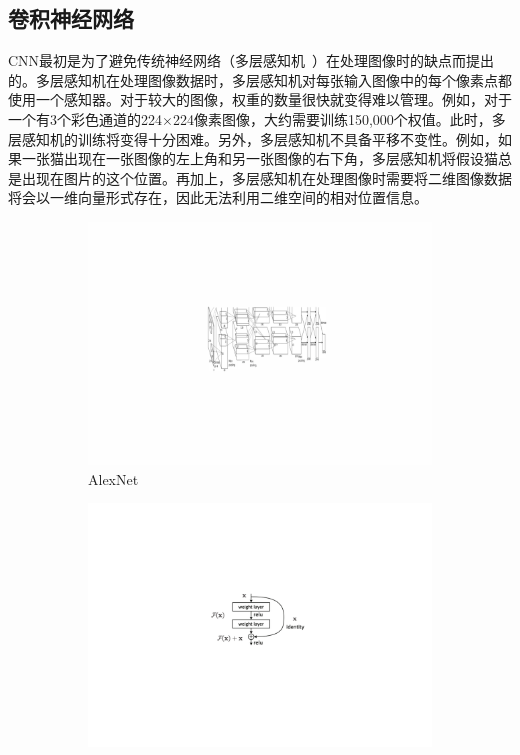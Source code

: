\subsection{卷积神经网络}\label{subsec:cnn_introduction}
CNN最初是为了避免传统神经网络（多层感知机~\cite{gardner1998artificial}）在处理图像时的缺点而提出的。多层感知机在处理图像数据时，多层感知机对每张输入图像中的每个像素点都使用一个感知器。对于较大的图像，权重的数量很快就变得难以管理。例如，对于一个有3个彩色通道的224$\times$224像素图像，大约需要训练150,000个权值。此时，多层感知机的训练将变得十分困难。另外，多层感知机不具备平移不变性。例如，如果一张猫出现在一张图像的左上角和另一张图像的右下角，多层感知机将假设猫总是出现在图片的这个位置。再加上，多层感知机在处理图像时需要将二维图像数据将会以一维向量形式存在，因此无法利用二维空间的相对位置信息。

\begin{figure}[h!] %
	\centering
	\begin{subfigure}{0.35\textwidth}
		\centering
		\includegraphics[width=1.0\textwidth]{figure/popular_networks_alex_net}
		\caption{AlexNet~\cite{krizhevsky2012imagenet}}
		\label{subfig1}
	\end{subfigure}
	\quad
	\begin{subfigure}{0.336\textwidth}
		\centering
		\includegraphics[width=1.0\textwidth]{figure/popular_networks_resnet}

\end{subfigure}
\end{figure}
